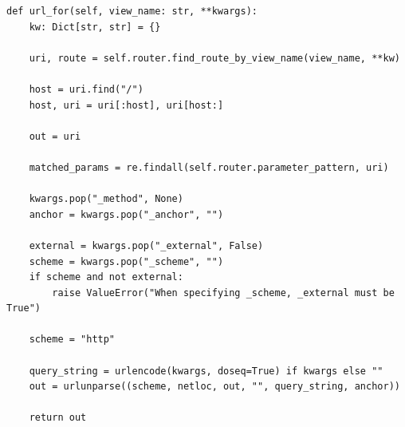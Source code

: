 \begin{verbatim}
def url_for(self, view_name: str, **kwargs):
    kw: Dict[str, str] = {}

    uri, route = self.router.find_route_by_view_name(view_name, **kw)

    host = uri.find("/")
    host, uri = uri[:host], uri[host:]

    out = uri

    matched_params = re.findall(self.router.parameter_pattern, uri)

    kwargs.pop("_method", None)
    anchor = kwargs.pop("_anchor", "")

    external = kwargs.pop("_external", False)
    scheme = kwargs.pop("_scheme", "")
    if scheme and not external:
        raise ValueError("When specifying _scheme, _external must be True")

    scheme = "http"

    query_string = urlencode(kwargs, doseq=True) if kwargs else ""
    out = urlunparse((scheme, netloc, out, "", query_string, anchor))

    return out
\end{verbatim}
